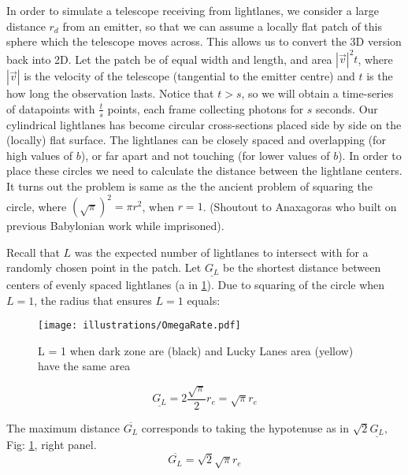 \documentclass[notitlepage]{article}
\begin{document}
In order to simulate a telescope receiving from lightlanes, we consider a large distance $r_d$ from an emitter, so that we can assume a locally flat patch of this sphere which the telescope moves across. This allows us to convert the 3D version back into 2D. Let the patch be of equal width and length, and area $|\vec{v}|^2 t$, where $|\vec{v}|$ is the velocity of the telescope (tangential to the emitter centre) and $t$ is the how long the observation lasts. Notice that $t > s$, so we will obtain a time-series of datapoints with $\frac{t}{s}$ points, each frame collecting photons for $s$ seconds. Our cylindrical lightlanes has become circular cross-sections placed side by side on the (locally) flat surface. The lightlanes can be closely spaced and overlapping (for high values of $b$), or far apart and not touching (for lower values of $b$). In order to place these circles we need to calculate the distance between the lightlane centers. It turns out the problem is same as the the ancient problem of squaring  the circle, where $(\sqrt{\pi})^2 = \pi r^2$, when $r = 1$. (Shoutout to Anaxagoras who built on previous Babylonian work while imprisoned).

Recall that $L$ was the expected number of lightlanes to intersect with for a randomly chosen point in the patch. Let $\underline{G_L}$ be the shortest distance between centers of evenly spaced lightlanes (a in \ref{fig:omegaRate}). Due to squaring of the circle when $L = 1$, the radius that ensures $L =1$ equals:

\begin{figure}
\centering
{\texttt{[image: illustrations/OmegaRate.pdf]}}
\caption{L = 1 when dark zone are (black) and Lucky Lanes area (yellow) have the same area}
\label{fig:omegaRate}
\end{figure}


\begin{equation}
\underline{G_L} =  2 \frac{\sqrt{\pi}}{2}r_e  = \sqrt{\pi}r_e
\label{eq:underline_G_L}
\end{equation}

The maximum distance $\overline{G_L}$ corresponds to taking the hypotenuse as in  $\sqrt{2}\underline{G_L}, $ Fig: \ref{fig:omegaRate}, right panel.
\begin{equation}
\overline{G_L} = \sqrt{2}\sqrt{\pi}r_e
\label{eq:overline_G_L}
\end{equation}
\end{document}
